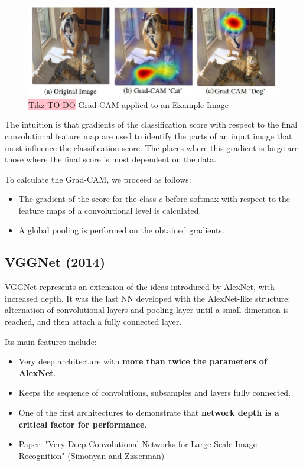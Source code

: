 \begin{figure}[!htbp]
    \centering
    \includegraphics[width=0.7\linewidth]{tikz/chapter5 - GradCam.png}
    \caption{{\color{red}\colorbox{pink}{Tikz TO-DO}}  Grad-CAM applied to an Example Image}
    \label{fig:gradcam}
\end{figure}

The intuition is that gradients of the classification score with respect to the final convolutional feature map are used to identify the parts of an input image that most influence the classification score. The places where this gradient is large are those where the final score is most dependent on the data.

To calculate the Grad-CAM, we proceed as follows:

\begin{itemize}
    \item The gradient of the score for the class \(c\) before softmax with respect to the feature maps of a convolutional level is calculated.
    \item A global pooling is performed on the obtained gradients.
\end{itemize}

\subsection{VGGNet (2014)}
VGGNet represents an extension of the ideas introduced by AlexNet, with increased depth. It was the last NN developed with the AlexNet-like structure: alternation of convolutional layers and pooling layer until a small dimension is reached, and then attach a fully connected layer.

Its main features include:
\begin{itemize}
    \item Very deep architecture with \textbf{more than twice the parameters of AlexNet}.
    \item Keeps the sequence of convolutions, subsamples and layers fully connected.
    \item One of the first architectures to demonstrate that \textbf{network depth is a critical factor for performance}.
    \item Paper: \href{https://arxiv.org/pdf/1409.1556.pdf}{"Very Deep Convolutional Networks for Large-Scale Image Recognition" (Simonyan and Zisserman)}
\end{itemize}

